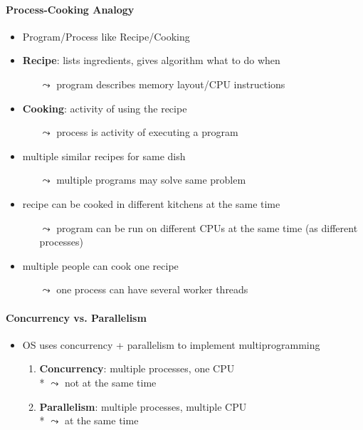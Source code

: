 \paragraph{Process-Cooking Analogy}
\begin{itemize}
	\item Program/Process like Recipe/Cooking
	\item \textbf{Recipe}: lists ingredients, gives algorithm what to do when
	\begin{itemize}
		\item[$ \leadsto $] program describes memory layout/CPU instructions
	\end{itemize}
	\item \textbf{Cooking}: activity of using the recipe
	\begin{itemize}
		\item[$ \leadsto $] process is activity of executing a program
	\end{itemize}
	\item multiple similar recipes for same dish
	\begin{itemize}
		\item[$ \leadsto $] multiple programs may solve same problem
	\end{itemize}
	\item recipe can be cooked in different kitchens at the same time
	\begin{itemize}
		\item[$ \leadsto $] program can be run on different CPUs at the same time (as different processes)
	\end{itemize}
	\item multiple people can cook one recipe
	\begin{itemize}
		\item[$ \leadsto $] one process can have several worker threads
	\end{itemize}
\end{itemize}

\paragraph{Concurrency vs. Parallelism}
\begin{itemize}
	\item OS uses concurrency + parallelism to implement multiprogramming
	\begin{enumerate}
		\item \textbf{Concurrency}: multiple processes, one CPU \\* \( \leadsto \) not at the same time
		\item \textbf{Parallelism}: multiple processes, multiple CPU \\* \( \leadsto \) at the same time
	\end{enumerate}
\end{itemize}

